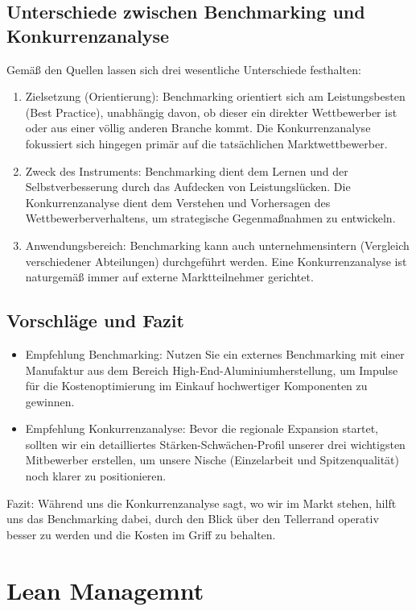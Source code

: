 \documentclass[12pt, a4paper]{article}
\begin{document}
\subsection{Unterschiede zwischen Benchmarking und Konkurrenzanalyse}
Gemäß den Quellen lassen sich drei wesentliche Unterschiede festhalten:
\begin{enumerate}
    \item Zielsetzung (Orientierung): Benchmarking orientiert sich am Leistungsbesten (Best Practice), unabhängig davon, ob dieser ein direkter Wettbewerber ist oder aus einer völlig anderen Branche kommt. Die Konkurrenzanalyse fokussiert sich hingegen primär auf die tatsächlichen Marktwettbewerber.
    \item Zweck des Instruments: Benchmarking dient dem Lernen und der Selbstverbesserung durch das Aufdecken von Leistungslücken. Die Konkurrenzanalyse dient dem Verstehen und Vorhersagen des Wettbewerberverhaltens, um strategische Gegenmaßnahmen zu entwickeln.
    \item Anwendungsbereich: Benchmarking kann auch unternehmensintern (Vergleich verschiedener Abteilungen) durchgeführt werden. Eine Konkurrenzanalyse ist naturgemäß immer auf externe Marktteilnehmer gerichtet.
\end{enumerate}
    
\subsection{Vorschläge und Fazit}
\begin{itemize}
    \item Empfehlung Benchmarking: Nutzen Sie ein externes Benchmarking mit einer Manufaktur aus dem Bereich High-End-Aluminiumherstellung, um Impulse für die Kostenoptimierung im Einkauf hochwertiger Komponenten zu gewinnen.
    \item Empfehlung Konkurrenzanalyse: Bevor die regionale Expansion startet, sollten wir ein detailliertes Stärken-Schwächen-Profil unserer drei wichtigsten Mitbewerber erstellen, um unsere Nische (Einzelarbeit und Spitzenqualität) noch klarer zu positionieren.
\end{itemize}

Fazit: Während uns die Konkurrenzanalyse sagt, wo wir im Markt stehen, hilft uns das 
Benchmarking dabei, durch den Blick über den Tellerrand operativ besser zu werden und die Kosten im Griff zu behalten.    
\newpage

\section{Lean Managemnt}
\end{document}
